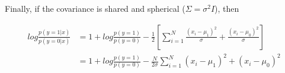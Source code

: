 {Finally, if the covariance is shared and spherical ($\Sigma = \sigma^2I$), then

\begin{align}
    log\frac{p(y=1|x)}{p(y=0|x)}&= 1 + log\frac{p(y=1)}{p(y=0)} - \frac{1}{2}\left [ 
    \sum_{i=1}^{N} \frac{(x_i-\mu_1)^2}{\sigma} + \frac{(x_i-\mu_0)^2}{\sigma} \right ] \\
    &= 1 + log\frac{p(y=1)}{p(y=0)} - \frac{N}{2\sigma}
    \sum_{i=1}^{N} (x_i-\mu_1)^2 + (x_i-\mu_0)^2 
\end{align}

}


